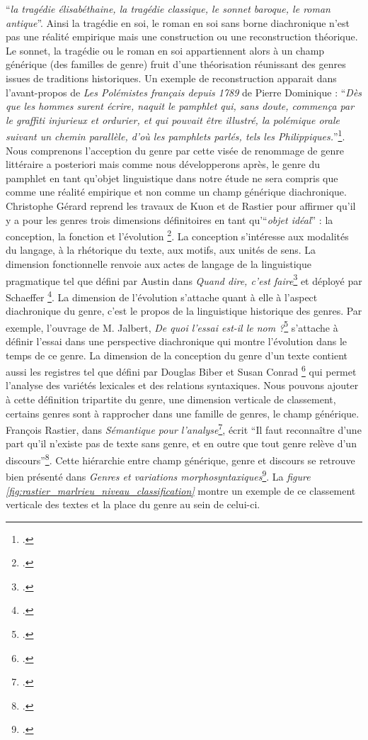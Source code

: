 \enquote{\textit{la tragédie élisabéthaine, la tragédie classique, le sonnet baroque, le roman antique}}. Ainsi la tragédie en soi, le roman en soi sans borne diachronique n'est pas une réalité empirique mais une construction ou une reconstruction théorique. Le sonnet, la tragédie ou le roman en soi appartiennent alors à un champ générique (des familles de genre) fruit d'une théorisation réunissant des genres issues de traditions historiques. Un exemple de reconstruction apparait dans l'avant-propos de \textit{Les Polémistes français depuis 1789} de Pierre Dominique : \enquote{\textit{Dès que les hommes surent écrire, naquit le pamphlet qui, sans doute, commença par le graffiti injurieux et ordurier, et qui pouvait être illustré, la polémique orale suivant un chemin parallèle, d'où les pamphlets parlés, tels les Philippiques.}}\footcites{dominique_les_1962}. Nous comprenons l'acception du genre par cette visée de renommage de genre littéraire a posteriori mais comme nous développerons après, le genre du pamphlet en tant qu'objet linguistique dans notre étude ne sera compris que comme une réalité empirique et non comme un champ générique diachronique. 
Christophe Gérard reprend les travaux de Kuon et de Rastier pour affirmer qu'il y a pour les genres trois dimensions définitoires en tant qu'\enquote{\textit{objet idéal}} : la conception, la fonction et l'évolution \footcites{gerard_linguistique_2019}. La conception s'intéresse aux modalités du langage, à la rhétorique du texte, aux motifs, aux unités de sens. La dimension fonctionnelle renvoie aux actes de langage de la linguistique pragmatique tel que défini par Austin dans \textit{Quand dire, c'est faire}\footcites{austin_quand_1970} et déployé par Schaeffer \footcites{schaeffer_quest-ce_1989}. La dimension de l'évolution s'attache quant à elle à l'aspect diachronique du genre, c'est le propos de la linguistique historique des genres. Par exemple, l'ouvrage de M. Jalbert, \textit{De quoi l'essai est-il le nom ?}\footcites{jalbert_quoi_2013} s'attache à définir l'essai dans une perspective diachronique qui montre l'évolution dans le temps de ce genre. La dimension de la conception du genre d'un texte contient aussi les registres tel que défini par Douglas Biber et Susan Conrad \footcites{biber_register_2009} qui permet l'analyse des variétés lexicales et des relations syntaxiques.
Nous pouvons ajouter à cette définition tripartite du genre, une dimension verticale de classement, certains genres sont à rapprocher dans une famille de genres, le champ générique. François Rastier, dans \textit{Sémantique pour l'analyse}\footcites{rastier_malrieu_nodate}, écrit \enquote{Il faut reconnaître d'une part qu'il n'existe pas de texte sans genre, et en outre que tout genre relève d'un discours}\footcites{rastier_malrieu_nodate}. Cette hiérarchie entre champ générique, genre et discours se retrouve bien présenté dans \textit{Genres et variations morphosyntaxiques}\footcites{rastier_malrieu_nodate}. La \textit{figure \ref{fig:rastier_marlrieu_niveau_classification}} montre un exemple de ce classement verticale des textes et la place du genre au sein de celui-ci.
